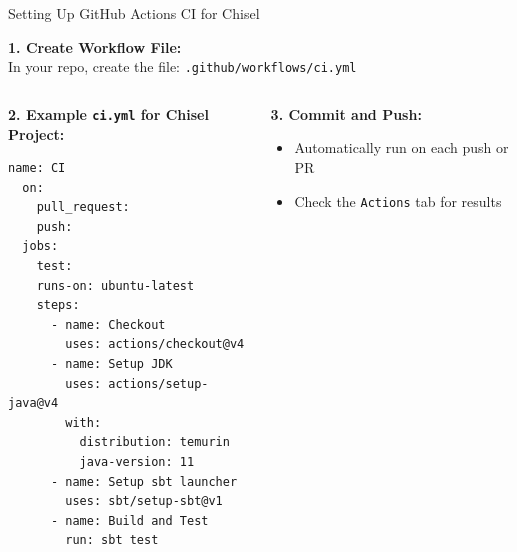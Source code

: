 \begin{frame}[fragile]{Setting Up GitHub Actions CI for Chisel}
	\scriptsize
	
	\textbf{1. Create Workflow File:} \\
	In your repo, create the file: \texttt{.github/workflows/ci.yml}
	
	\pause
	\begin{columns}
		\begin{column}{0.5\textwidth}
			\textbf{2. Example \texttt{ci.yml} for Chisel Project:}
			\begin{verbatim}
name: CI
  on:
    pull_request:
    push:
  jobs:
    test:
    runs-on: ubuntu-latest
    steps:
      - name: Checkout
        uses: actions/checkout@v4
      - name: Setup JDK
        uses: actions/setup-java@v4
        with:
          distribution: temurin
          java-version: 11
      - name: Setup sbt launcher
        uses: sbt/setup-sbt@v1
      - name: Build and Test
        run: sbt test
			\end{verbatim}
		\end{column}
		\begin{column}{0.4\textwidth}
	
			\pause
			\textbf{3. Commit and Push:}
			\begin{itemize}
				\item Automatically run on each push or PR
				\item Check the \texttt{Actions} tab for results
			\end{itemize}
		\end{column}
	\end{columns}
	
\end{frame}

